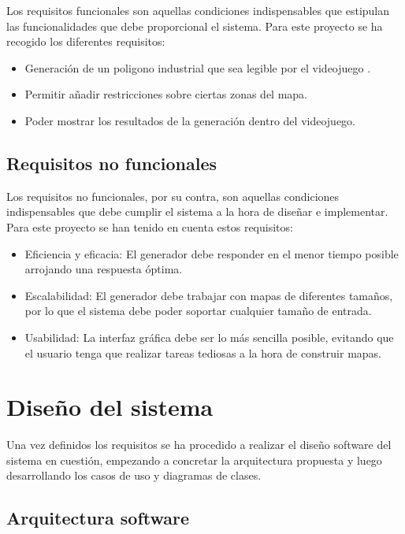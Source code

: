 Los requisitos funcionales son aquellas condiciones indispensables que estipulan las funcionalidades que debe proporcional el sistema. Para este proyecto se ha recogido los diferentes requisitos:

\begin{itemize}
	\item Generación de un poligono industrial que sea legible por el videojuego \cities.
	\item Permitir añadir restricciones sobre ciertas zonas del mapa.
	\item Poder mostrar los resultados de la generación dentro del videojuego.
\end{itemize}

\subsection{Requisitos no funcionales}

Los requisitos no funcionales, por su contra, son aquellas condiciones indispensables que debe cumplir el sistema a la hora de diseñar e implementar. Para este proyecto se han tenido en cuenta estos requisitos:

\begin{itemize}
	\item Eficiencia y eficacia: El generador debe responder en el menor tiempo posible arrojando una respuesta óptima.
	\item Escalabilidad: El generador debe trabajar con mapas de diferentes tamaños, por lo que el sistema debe poder soportar cualquier tamaño de entrada.
	\item Usabilidad: La interfaz gráfica debe ser lo más sencilla posible, evitando que el usuario tenga que realizar tareas tediosas a la hora de construir mapas.
\end{itemize}

\section{Diseño del sistema}

Una vez definidos los requisitos se ha procedido a realizar el diseño software del sistema en cuestión, empezando a concretar la arquitectura propuesta y luego desarrollando los casos de uso y diagramas de clases.

\subsection{Arquitectura software}
\label{subsec:arquitectura}

